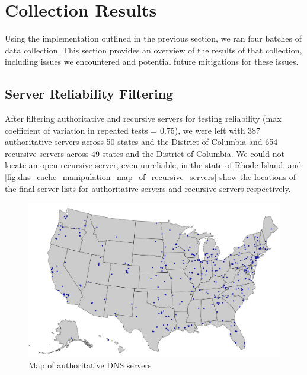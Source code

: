 \section{Collection Results}\label{sec:dns_results} %

Using the implementation outlined in the previous section, we ran four batches of data collection. This section provides an overview of the results of that collection, including issues we encountered and potential future mitigations for these issues.

\subsection{Server Reliability Filtering}

After filtering authoritative and recursive \dns servers for testing reliability (max coefficient of variation in repeated tests = 0.75), we were left with 387 authoritative servers across 50 states and the District of Columbia and 654 recursive servers across 49 states and the District of Columbia. We could not locate an open recursive \dns server, even unreliable, in the state of Rhode Island.  and \cref{fig:dns_cache_manipulation_map_of_recursive_servers} show the locations of the final server lists for authoritative servers and recursive servers respectively.

\begin{figure}[h]
    \centering
    \includegraphics{images/dns/server_locations/auth_server_locations.png}
    \caption{Map of authoritative DNS servers}
    \label{fig:dns_cache_manipulation_map_of_authoritative_servers}
\end{figure}

